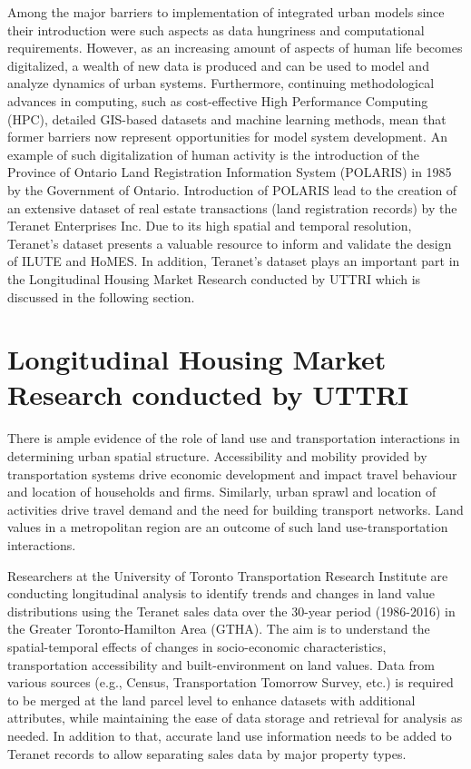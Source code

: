 Among the major barriers to implementation of integrated urban models since their introduction were such aspects as data hungriness and computational requirements\cite{Miller1998}.
However, as an increasing amount of aspects of human life becomes digitalized, a wealth of new data is produced and can be used to model and analyze dynamics of urban systems\cite{Arribas-Bel2014,Chen2016}.
Furthermore, continuing methodological advances in computing, such as cost-effective High Performance Computing (HPC), detailed GIS-based datasets and machine learning methods, mean that former barriers now represent opportunities for model system development\cite{Miller2018a}.
An example of such digitalization of human activity is the introduction of the Province of Ontario Land Registration Information System (POLARIS) in 1985 by the Government of Ontario\cite{TeranetEnterprisesInc.}.
Introduction of POLARIS lead to the creation of an extensive dataset of real estate transactions (land registration records) by the Teranet Enterprises Inc.
Due to its high spatial and temporal resolution, Teranet's dataset presents a valuable resource to inform and validate the design of ILUTE and HoMES.
In addition, Teranet's dataset plays an important part in the Longitudinal Housing Market Research conducted by UTTRI which is discussed in the following section.

\section{Longitudinal Housing Market Research conducted by UTTRI} \label{sec:longitudinal_housing_market_research}

There is ample evidence of the role of land use and transportation interactions in determining urban spatial structure.
Accessibility and mobility provided by transportation systems drive economic development and impact travel behaviour and location of households and firms.
Similarly, urban sprawl and location of activities drive travel demand and the need for building transport networks.
Land values in a metropolitan region are an outcome of such land use-transportation interactions.

Researchers at the University of Toronto Transportation Research Institute are conducting longitudinal analysis to identify trends and changes in land value distributions using the Teranet sales data over the 30-year period (1986-2016) in the Greater Toronto-Hamilton Area (GTHA).
The aim is to understand the spatial-temporal effects of changes in socio-economic characteristics, transportation accessibility and built-environment on land values.
Data from various sources (e.g., Census, Transportation Tomorrow Survey, etc.) is required to be merged at the land parcel level to enhance datasets with additional attributes, while maintaining the ease of data storage and retrieval for analysis as needed.
In addition to that, accurate land use information needs to be added to Teranet records to allow separating sales data by major property types.

